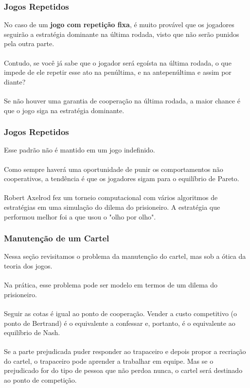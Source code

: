 \documentclass{beamer}[10]
\begin{document}
\begin{frame}
	\frametitle{Jogos Repetidos}

	No caso de um \textbf{jogo com repetição fixa}, é muito provável que os jogadores seguirão a estratégia dominante na última rodada, visto que não serão punidos pela outra parte.
	\\~\\
	Contudo, se você já sabe que o jogador será egoísta na última rodada, o que impede de ele repetir esse ato na penúltima, e na antepenúltima e assim por diante?
	\\~\\
	Se não houver uma garantia de cooperação na última rodada, a maior chance é que o jogo siga na estratégia dominante. 

\end{frame}

\begin{frame}
	\frametitle{Jogos Repetidos}

	Esse padrão não é mantido em um jogo indefinido. 
	\\~\\
	Como sempre haverá uma oportunidade de punir os comportamentos não cooperativos, a tendência é que os jogadores sigam para o equilíbrio de Pareto.
	\\~\\
	Robert Axelrod fez um torneio computacional com vários algoritmos de estratégias em uma simulação do dilema do prisioneiro. A estratégia que performou melhor foi a que usou o "olho por olho".

\end{frame}

\begin{frame}
	\frametitle{Manutenção de um Cartel}

	Nessa seção revisitamos o problema da manutenção do cartel, mas sob a ótica da teoria dos jogos.
	\\~\\
	Na prática, esse problema pode ser modelo em termos de um dilema do prisioneiro.
	\\~\\
	Seguir as cotas é igual ao ponto de cooperação. Vender a custo competitivo (o ponto de Bertrand) é o equivalente a confessar e, portanto, é o equivalente ao equilíbrio de Nash.
	\\~\\
	Se a parte prejudicada puder responder ao trapaceiro e depois propor a recriação do cartel, o trapaceiro pode aprender a trabalhar em equipe. Mas se o prejudicado for do tipo de pessoa que não perdoa nunca, o cartel será destinado ao ponto de competição.

\end{frame}
\end{document}

